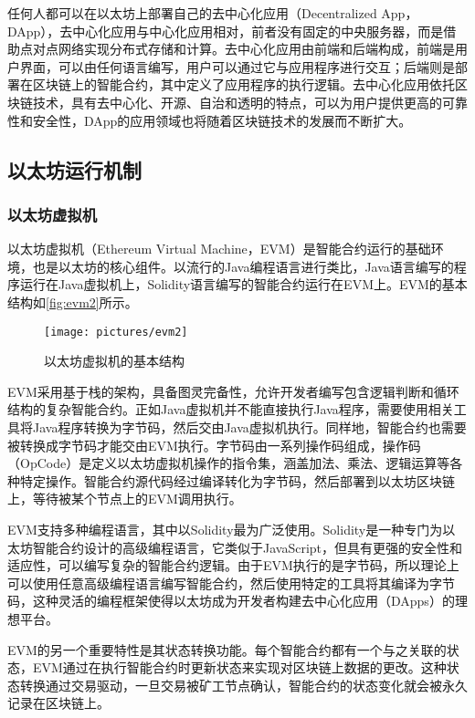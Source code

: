     任何人都可以在以太坊上部署自己的去中心化应用（Decentralized App，DApp），去中心化应用与中心化应用相对，前者没有固定的中央服务器，而是借助点对点网络实现分布式存储和计算。去中心化应用由前端和后端构成，前端是用户界面，可以由任何语言编写，用户可以通过它与应用程序进行交互；后端则是部署在区块链上的智能合约，其中定义了应用程序的执行逻辑\cite{lileixiao}。去中心化应用依托区块链技术，具有去中心化、开源、自治和透明的特点，可以为用户提供更高的可靠性和安全性，DApp的应用领域也将随着区块链技术的发展而不断扩大。


\subsection{以太坊运行机制}
\label{sec:以太坊运行机制}

\subsubsection{以太坊虚拟机}
    
    以太坊虚拟机（Ethereum Virtual Machine，EVM）是智能合约运行的基础环境，也是以太坊的核心组件。以流行的Java编程语言进行类比，Java语言编写的程序运行在Java虚拟机上，Solidity语言编写的智能合约运行在EVM上。EVM的基本结构如\autoref{fig:evm2}所示。
        \begin{figure}[htbp]
            \centering
            \texttt{[image: pictures/evm2]}
            \caption{\label{fig:evm2}以太坊虚拟机的基本结构}
        \end{figure}

    EVM采用基于栈的架构，具备图灵完备性，允许开发者编写包含逻辑判断和循环结构的复杂智能合约。正如Java虚拟机并不能直接执行Java程序，需要使用相关工具将Java程序转换为字节码，然后交由Java虚拟机执行。同样地，智能合约也需要被转换成字节码才能交由EVM执行。字节码由一系列操作码组成，操作码（OpCode）是定义以太坊虚拟机操作的指令集，涵盖加法、乘法、逻辑运算等各种特定操作。智能合约源代码经过编译转化为字节码，然后部署到以太坊区块链上，等待被某个节点上的EVM调用执行。

    EVM支持多种编程语言，其中以Solidity最为广泛使用。Solidity是一种专门为以太坊智能合约设计的高级编程语言，它类似于JavaScript，但具有更强的安全性和适应性，可以编写复杂的智能合约逻辑。由于EVM执行的是字节码，所以理论上可以使用任意高级编程语言编写智能合约，然后使用特定的工具将其编译为字节码，这种灵活的编程框架使得以太坊成为开发者构建去中心化应用（DApps）的理想平台\cite{chen2020understand}。

    EVM的另一个重要特性是其状态转换功能。每个智能合约都有一个与之关联的状态，EVM通过在执行智能合约时更新状态来实现对区块链上数据的更改。这种状态转换通过交易驱动，一旦交易被矿工节点确认，智能合约的状态变化就会被永久记录在区块链上。

